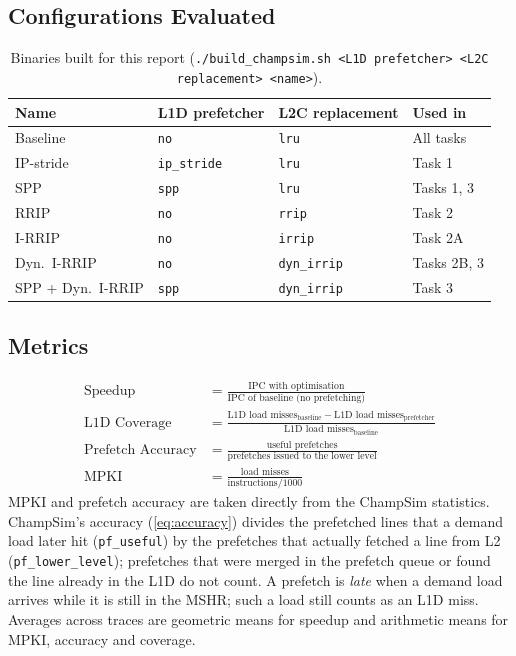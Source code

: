 \documentclass[11pt,a4paper]{article}
\theoremstyle{themethm}
\theoremstyle{themedef}
\theoremstyle{themeex}
\theoremstyle{themerem}
\newcommand{\tablesetup}{%
  \arrayrulecolor{tablerule}%
  \setlength{\aboverulesep}{0pt}\setlength{\belowrulesep}{0pt}%
  \renewcommand{\arraystretch}{1.3}%
  \rowcolors{2}{white}{tablerow}}
\newcommand{\colhead}[1]{\textbf{\color{tableheadtext}#1}}
\begin{document}
\subsection{Configurations Evaluated}\label{sec:configs}
\begin{table}[htbp]
\centering
\caption{Binaries built for this report (\texttt{./build\_champsim.sh <L1D prefetcher> <L2C replacement> <name>}).}\label{tab:binaries}
\tablesetup
\begin{tabular}{llll}
\toprule
\rowcolor{tablehead}\colhead{Name} & \colhead{L1D prefetcher} & \colhead{L2C replacement} & \colhead{Used in} \\
\midrule
Baseline        & \texttt{no}        & \texttt{lru}       & All tasks \\
IP-stride       & \texttt{ip\_stride} & \texttt{lru}      & Task 1 \\
SPP             & \texttt{spp}       & \texttt{lru}       & Tasks 1, 3 \\
RRIP            & \texttt{no}        & \texttt{rrip}      & Task 2 \\
I-RRIP          & \texttt{no}        & \texttt{irrip}     & Task 2A \\
Dyn.\ I-RRIP    & \texttt{no}        & \texttt{dyn\_irrip} & Tasks 2B, 3 \\
SPP + Dyn.\ I-RRIP & \texttt{spp}    & \texttt{dyn\_irrip} & Task 3 \\
\bottomrule
\end{tabular}
\end{table}

\subsection{Metrics}\label{sec:metrics}
\begin{align}
\text{Speedup} &= \frac{\text{IPC with optimisation}}{\text{IPC of baseline (no prefetching)}} \label{eq:speedup}\\[4pt]
\text{L1D Coverage} &= \frac{\text{L1D load misses}_{\text{baseline}} - \text{L1D load misses}_{\text{prefetcher}}}{\text{L1D load misses}_{\text{baseline}}} \label{eq:coverage}\\[4pt]
\text{Prefetch Accuracy} &= \frac{\text{useful prefetches}}{\text{prefetches issued to the lower level}} \label{eq:accuracy}\\[4pt]
\text{MPKI} &= \frac{\text{load misses}}{\text{instructions}/1000} \label{eq:mpki}
\end{align}
MPKI and prefetch accuracy are taken directly from the ChampSim statistics.
ChampSim's accuracy (\cref{eq:accuracy}) divides the prefetched lines that a
demand load later hit (\texttt{pf\_useful}) by the prefetches that actually
fetched a line from L2 (\texttt{pf\_lower\_level}); prefetches that were
merged in the prefetch queue or found the line already in the L1D do not count.
A prefetch is \emph{late} when a demand load arrives while it is still in the
MSHR; such a load still counts as an L1D miss. Averages across traces are
geometric means for speedup and arithmetic means for MPKI, accuracy and coverage.
\end{document}
